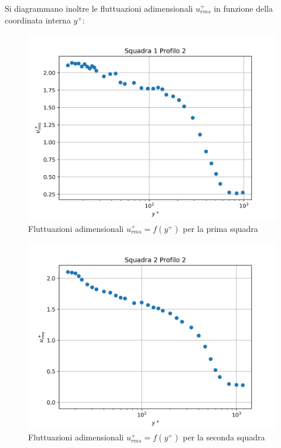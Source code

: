 \noindent Si diagrammano inoltre le fluttuazioni adimensionali $u^+_{rms}$ in funzione della coordinata interna $y^+$:
\begin{figure}[H]
    \centering
    \includegraphics[width=.8\textwidth]{images/9/sq1p2+_rms.png}
    \caption{Fluttuazioni adimensionali $u^+_{rms}=f(y^+)$ per la prima squadra}
\end{figure}

\begin{figure}[H]
    \centering
    \includegraphics[width=.85\textwidth]{images/9/sq2p2+_rms.png}
    \caption{Fluttuazioni adimensionali $u^+_{rms}=f(y^+)$ per la seconda squadra}
\end{figure}

